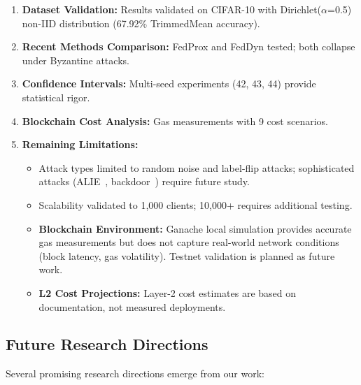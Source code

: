 \documentclass[12pt,a4paper,onecolumn]{article}
\begin{document}
\begin{enumerate}
    \item \textbf{Dataset Validation:} Results validated on CIFAR-10 with Dirichlet($\alpha$=0.5) non-IID distribution (67.92\% TrimmedMean accuracy).
    
    \item \textbf{Recent Methods Comparison:} FedProx and FedDyn tested; both collapse under Byzantine attacks.
    
    \item \textbf{Confidence Intervals:} Multi-seed experiments (42, 43, 44) provide statistical rigor.
    
    \item \textbf{Blockchain Cost Analysis:} Gas measurements with 9 cost scenarios.
    
    \item \textbf{Remaining Limitations:}
    \begin{itemize}
        \item Attack types limited to random noise and label-flip attacks; sophisticated attacks (ALIE~\cite{baruch2019little}, backdoor~\cite{sun2019backdoor}) require future study.
        \item Scalability validated to 1,000 clients; 10,000+ requires additional testing.
        \item \textbf{Blockchain Environment:} Ganache local simulation provides accurate gas measurements but does not capture real-world network conditions (block latency, gas volatility). Testnet validation is planned as future work.
        \item \textbf{L2 Cost Projections:} Layer-2 cost estimates are based on documentation, not measured deployments.
    \end{itemize}
\end{enumerate}

\subsection{Future Research Directions}

Several promising research directions emerge from our work:
\end{document}
